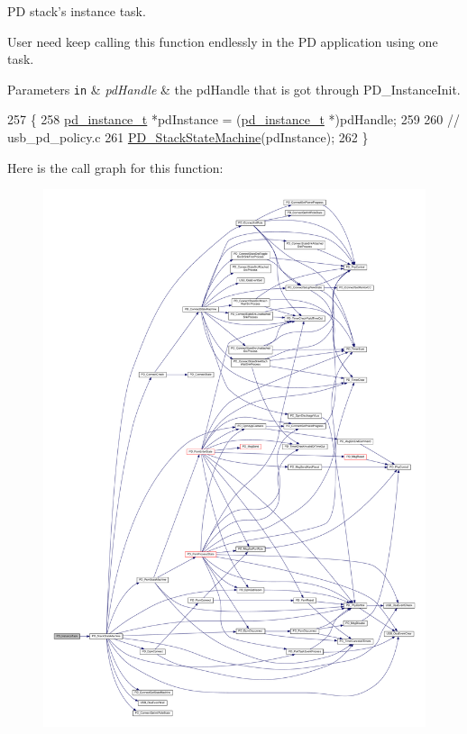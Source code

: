 P\-D stack's instance task. 

User need keep calling this function endlessly in the P\-D application using one task.


\begin{DoxyParams}[1]{Parameters}
\mbox{\tt in}  & {\em pd\-Handle} & the pd\-Handle that is got through P\-D\-\_\-\-Instance\-Init. \\
\hline
\end{DoxyParams}

\begin{DoxyCode}
257 \{
258     \hyperlink{struct__pd__instance}{pd\_instance\_t} *pdInstance = (\hyperlink{struct__pd__instance}{pd\_instance\_t} *)pdHandle;
259 
260     \textcolor{comment}{// usb\_pd\_policy.c}
261     \hyperlink{usb__pd__interface_8c_a602f8622c0ba8d21b5013537dd3dadf9}{PD\_StackStateMachine}(pdInstance);
262 \}
\end{DoxyCode}


Here is the call graph for this function\-:
\nopagebreak
\begin{figure}[H]
\begin{center}
\leavevmode
\includegraphics[width=350pt]{group__usb__pd__stack_ga4227c58a9524464e19ee6efe9615f78e_cgraph}
\end{center}
\end{figure}




